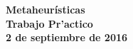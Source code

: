 \documentclass[11pt,a4paper]{article}
\theoremstyle{definition}
\begin{document}
\parskip=5pt

\thispagestyle{empty}

\def\Materia{Metaheurísticas}
\def\Titulo{Trabajo Pr'actico}
\def\Fecha{2 de septiembre de 2016}

\begin{center}
    {\LARGE\textbf{\Materia}}\\[1em]    
    \vspace{5mm}
    {\Large \textbf{\Titulo}}\\[1em]
    \vspace{2mm}
    {\textbf{\large \Fecha}}\\
    \vspace{5mm}
    \textbf{\tablaints}
\end{center}

\tableofcontents

\newpage

\pagestyle{headings}
\setcounter{page}{1}

%





\end{document}
